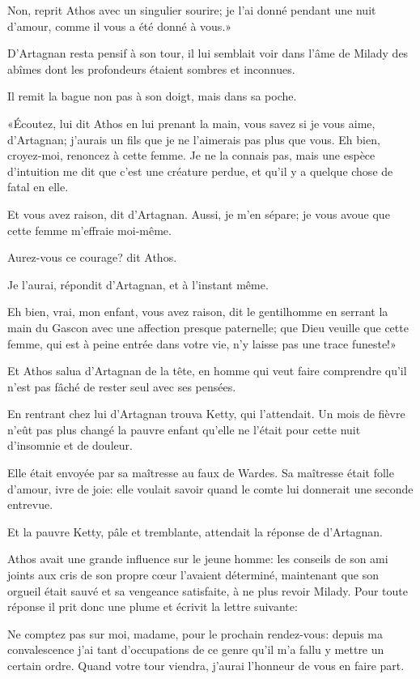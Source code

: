 \speak  Non, reprit Athos avec un singulier sourire; je l'ai donné pendant une nuit d'amour, comme il vous a été donné à vous.» 

D'Artagnan resta pensif à son tour, il lui semblait voir dans l'âme de Milady des abîmes dont les profondeurs étaient sombres et inconnues. 

Il remit la bague non pas à son doigt, mais dans sa poche. 

«Écoutez, lui dit Athos en lui prenant la main, vous savez si je vous aime, d'Artagnan; j'aurais un fils que je ne l'aimerais pas plus que vous. Eh bien, croyez-moi, renoncez à cette femme. Je ne la connais pas, mais une espèce d'intuition me dit que c'est une créature perdue, et qu'il y a quelque chose de fatal en elle. 

\speak  Et vous avez raison, dit d'Artagnan. Aussi, je m'en sépare; je vous avoue que cette femme m'effraie moi-même. 

\speak  Aurez-vous ce courage? dit Athos. 

\speak  Je l'aurai, répondit d'Artagnan, et à l'instant même. 

\speak  Eh bien, vrai, mon enfant, vous avez raison, dit le gentilhomme en serrant la main du Gascon avec une affection presque paternelle; que Dieu veuille que cette femme, qui est à peine entrée dans votre vie, n'y laisse pas une trace funeste!» 

Et Athos salua d'Artagnan de la tête, en homme qui veut faire comprendre qu'il n'est pas fâché de rester seul avec ses pensées. 

En rentrant chez lui d'Artagnan trouva Ketty, qui l'attendait. Un mois de fièvre n'eût pas plus changé la pauvre enfant qu'elle ne l'était pour cette nuit d'insomnie et de douleur. 

Elle était envoyée par sa maîtresse au faux de Wardes. Sa maîtresse était folle d'amour, ivre de joie: elle voulait savoir quand le comte lui donnerait une seconde entrevue. 

Et la pauvre Ketty, pâle et tremblante, attendait la réponse de d'Artagnan. 

Athos avait une grande influence sur le jeune homme: les conseils de son ami joints aux cris de son propre cœur l'avaient déterminé, maintenant que son orgueil était sauvé et sa vengeance satisfaite, à ne plus revoir Milady. Pour toute réponse il prit donc une plume et écrivit la lettre suivante: 

\begin{mail}{}{}
Ne comptez pas sur moi, madame, pour le prochain rendez-vous: depuis ma convalescence j'ai tant d'occupations de ce genre qu'il m'a fallu y mettre un certain ordre. Quand votre tour viendra, j'aurai l'honneur de vous en faire part. 
\end{mail}

